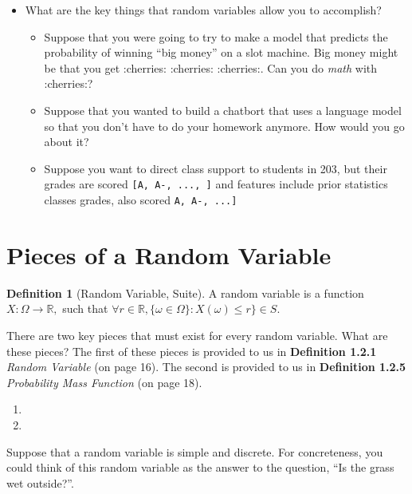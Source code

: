 \documentclass[
]{book}
\providecommand{\tightlist}{%
  \setlength{\itemsep}{0pt}\setlength{\parskip}{0pt}}
\theoremstyle{definition}
\newtheorem{definition}{Definition}[chapter]
\theoremstyle{definition}
\theoremstyle{definition}
\theoremstyle{definition}
\theoremstyle{remark}
\begin{document}
\begin{itemize}
\tightlist
\item
  What are the key things that random variables allow you to accomplish?

  \begin{itemize}
  \tightlist
  \item
    Suppose that you were going to try to make a model that predicts the probability of winning ``big money'' on a slot machine. Big money might be that you get :cherries: :cherries: :cherries:. Can you do \emph{math} with :cherries:?
  \item
    Suppose that you wanted to build a chatbort that uses a language model so that you don't have to do your homework anymore. How would you go about it?
  \item
    Suppose you want to direct class support to students in 203, but their grades are scored \texttt{{[}A,\ A-,\ ...,\ {]}} and features include prior statistics classes grades, also scored \texttt{A,\ A-,\ ...{]}}
  \end{itemize}
\end{itemize}

\hypertarget{pieces-of-a-random-variable}{%
\section{Pieces of a Random Variable}\label{pieces-of-a-random-variable}}

\begin{definition}[Random Variable, Suite]
A random variable is a function \(X : \Omega \rightarrow \mathbb{R},\) such that \(\forall r \in \mathbb{R}, \{\omega \in \Omega\}: X(\omega) \leq r\} \in S\).
\end{definition}

There are two key pieces that must exist for every random variable. What are these pieces? The first of these pieces is provided to us in \textbf{Definition 1.2.1} \emph{Random Variable} (on page 16). The second is provided to us in \textbf{Definition 1.2.5} \emph{Probability Mass Function} (on page 18).

\begin{enumerate}
\def\labelenumi{\arabic{enumi}.}
\tightlist
\item
\item
\end{enumerate}

Suppose that a random variable is simple and discrete. For concreteness, you could think of this random variable as the answer to the question, ``Is the grass wet outside?''.
\end{document}
